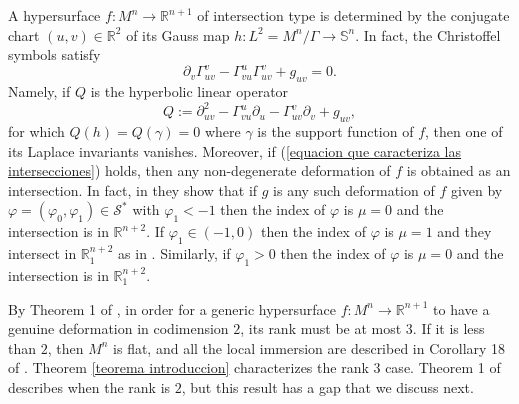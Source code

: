 \documentclass{article}
\theoremstyle{remark}
\begin{document}
A hypersurface $f:M^n\rightarrow\mathbb{R}^{n+1}$ of intersection type is determined by the conjugate chart $(u,v)\in\mathbb{R}^2$ of its Gauss map $h:L^2=M^n/\Gamma\rightarrow\mathbb{S}^n$. In fact, the Christoffel symbols satisfy 
\begin{equation}\label{equacion que caracteriza las intersecciones}
    \partial_v\Gamma_{uv}^v-\Gamma_{vu}^u\Gamma_{uv}^v+g_{uv}=0.
\end{equation}
Namely, if $Q$ is the hyperbolic linear operator 
$$Q:=\partial_{uv}^2-\Gamma_{vu}^u\partial_u-\Gamma_{uv}^v\partial_v+g_{uv},$$
for which $Q(h)=Q(\gamma)=0$ where $\gamma$ is the support function of $f$, then one of its Laplace invariants vanishes.
Moreover, if (\ref{equacion que caracteriza las intersecciones}) holds, then any non-degenerate deformation of $f$ is obtained as an intersection. 
In fact, in \cite{DFT2} they show that if $g$ is any such deformation of $f$ given by $\varphi=(\varphi_0,\varphi_1)\in\mathcal{S}^{*}$ with $\varphi_1<-1$ then the index of $\varphi$ is $\mu=0$ and the intersection is in $\mathbb{R}^{n+2}$. 
If $\varphi_1\in(-1,0)$ then the index of $\varphi$ is $\mu=1$ and they intersect in $\mathbb{R}_1^{n+2}$ as in \cite{DF6}. 
Similarly, if $\varphi_1>0$ then the index of $\varphi$ is $\mu=0$ and the intersection is in $\mathbb{R}_1^{n+2}$.

By Theorem 1 of \cite{DF3}, in order for a generic hypersurface $f:M^n\rightarrow \mathbb{R}^{n+1}$ to have a genuine deformation in codimension $2$, its rank must be at most $3$. If it is less than $2$, then $M^n$ is flat, and all the local immersion are described in Corollary 18 of \cite{FF}. Theorem \ref{teorema introduccion} characterizes the rank $3$ case. Theorem 1 of \cite{DFT} describes when the rank is $2$, but this result has a gap that we discuss next.
\end{document}
